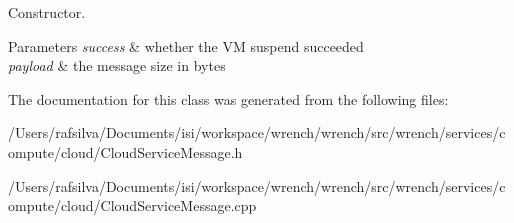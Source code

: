 Constructor. 


\begin{DoxyParams}{Parameters}
{\em success} & whether the VM suspend succeeded \\
\hline
{\em payload} & the message size in bytes \\
\hline
\end{DoxyParams}


The documentation for this class was generated from the following files\+:\begin{DoxyCompactItemize}
\item 
/\+Users/rafsilva/\+Documents/isi/workspace/wrench/wrench/src/wrench/services/compute/cloud/Cloud\+Service\+Message.\+h\item 
/\+Users/rafsilva/\+Documents/isi/workspace/wrench/wrench/src/wrench/services/compute/cloud/Cloud\+Service\+Message.\+cpp\end{DoxyCompactItemize}
